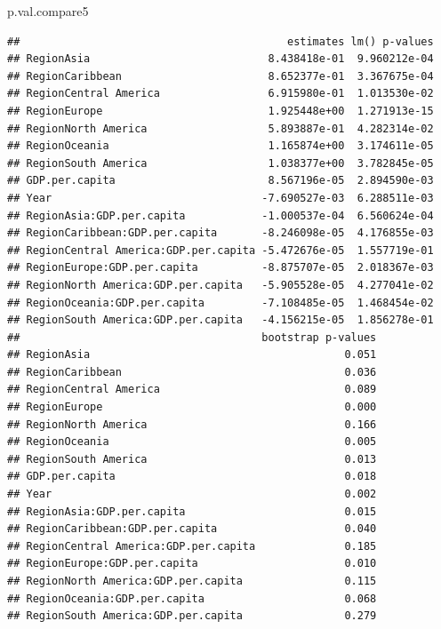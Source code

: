 \documentclass[11pt,]{article}
\newenvironment{Shaded}{\begin{snugshade}}{\end{snugshade}}
\newcommand{\NormalTok}[1]{#1}
\begin{document}
\begin{Shaded}
\begin{Highlighting}[]
\NormalTok{p.val.compare5}
\end{Highlighting}
\end{Shaded}

\begin{verbatim}
##                                          estimates lm() p-values
## RegionAsia                            8.438418e-01  9.960212e-04
## RegionCaribbean                       8.652377e-01  3.367675e-04
## RegionCentral America                 6.915980e-01  1.013530e-02
## RegionEurope                          1.925448e+00  1.271913e-15
## RegionNorth America                   5.893887e-01  4.282314e-02
## RegionOceania                         1.165874e+00  3.174611e-05
## RegionSouth America                   1.038377e+00  3.782845e-05
## GDP.per.capita                        8.567196e-05  2.894590e-03
## Year                                 -7.690527e-03  6.288511e-03
## RegionAsia:GDP.per.capita            -1.000537e-04  6.560624e-04
## RegionCaribbean:GDP.per.capita       -8.246098e-05  4.176855e-03
## RegionCentral America:GDP.per.capita -5.472676e-05  1.557719e-01
## RegionEurope:GDP.per.capita          -8.875707e-05  2.018367e-03
## RegionNorth America:GDP.per.capita   -5.905528e-05  4.277041e-02
## RegionOceania:GDP.per.capita         -7.108485e-05  1.468454e-02
## RegionSouth America:GDP.per.capita   -4.156215e-05  1.856278e-01
##                                      bootstrap p-values
## RegionAsia                                        0.051
## RegionCaribbean                                   0.036
## RegionCentral America                             0.089
## RegionEurope                                      0.000
## RegionNorth America                               0.166
## RegionOceania                                     0.005
## RegionSouth America                               0.013
## GDP.per.capita                                    0.018
## Year                                              0.002
## RegionAsia:GDP.per.capita                         0.015
## RegionCaribbean:GDP.per.capita                    0.040
## RegionCentral America:GDP.per.capita              0.185
## RegionEurope:GDP.per.capita                       0.010
## RegionNorth America:GDP.per.capita                0.115
## RegionOceania:GDP.per.capita                      0.068
## RegionSouth America:GDP.per.capita                0.279
\end{verbatim}
\end{document}
